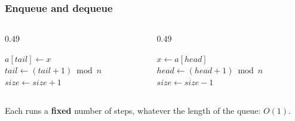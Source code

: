 \documentclass[aspectratio=169,10pt,compress]{beamer}
\begin{document}
\begin{frame}[t,fragile] \frametitle{Enqueue and dequeue}
  \begin{columns}[T]
    \begin{column}{0.49\textwidth}
      \SetAlFnt{\small}


\begin{algorithm}[H]
  \caption{Enqueue}
  $a[tail] \gets x$\;
  $tail \gets (tail + 1) \bmod n$\;
  $size \gets size + 1$\;
\end{algorithm}

    \end{column}
    \begin{column}{0.49\textwidth}
      \SetAlFnt{\small}


\begin{algorithm}[H]
  \caption{Dequeue}
  $x \gets a[head]$\;
  $head \gets (head + 1) \bmod n$\;
  $size \gets size - 1$\;
  \;
\end{algorithm}

    \end{column}
  \end{columns}
  \small Each runs a \textbf{fixed} number of steps, whatever the length of the queue: $O(1)$.
\end{frame}
\end{document}

